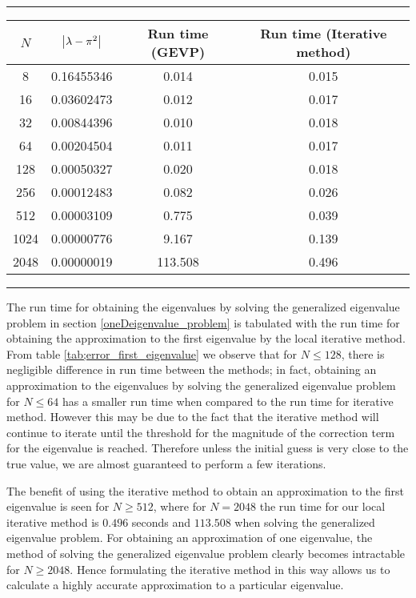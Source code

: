 \documentclass[a4paper, 12pt, twoside, openright]{article}
\numberwithin{equation}{section}
\begin{document}
\begin{table}[H]
\centering
\rule{\linewidth}{1.5pt}
\bgroup
\def\arrarystretch{1.25}
\begin{tabular}{ c@{\qquad} c@{\qquad} c@{\qquad} c@{\qquad} }
$N$ & $\abs{\lambda-\pi^2}$ & Run time (GEVP) & Run time (Iterative method) \\\hline
8 &   0.16455346   & 0.014 & 0.015 \\
16 &  0.03602473   & 0.012 & 0.017 \\
32 & 0.00844396   & 0.010  & 0.018\\
64 & 0.00204504   & 0.011 & 0.017\\
128 & 0.00050327 & 0.020 & 0.018\\
256 & 0.00012483 & 0.082 & 0.026\\
512 & 0.00003109  & 0.775 & 0.039 \\ 
1024 & 0.00000776 & 9.167  &0.139\\
2048 & 0.00000019 & 113.508 &0.496\\
\end{tabular}
\egroup
{}
\rule{\linewidth}{1.5pt}
\end{table}

The run time for obtaining the eigenvalues by solving the generalized eigenvalue problem in section \ref{oneDeigenvalue_problem} is tabulated with the run time for obtaining the approximation to the first eigenvalue by the local iterative method. From table \ref{tab;error_first_eigenvalue} we observe that for $N \leq 128$, there is negligible difference in run time between the methods; in fact, obtaining an approximation to the eigenvalues by solving the generalized eigenvalue problem for $N\leq64$ has a smaller run time when compared to the run time for iterative method. However this may be due to the fact that the iterative method will continue to iterate until the threshold for the magnitude of the correction term for the eigenvalue is reached. Therefore unless the initial guess is very close to the true value, we are almost guaranteed to perform a few iterations. %

The benefit of using the iterative method to obtain an approximation to the first eigenvalue is seen for $N\geq512$, where for $N=2048$ the run time for our local iterative method is $0.496$ seconds and $113.508$ when solving the generalized eigenvalue problem. For obtaining an approximation of one eigenvalue, the method of solving the generalized eigenvalue problem clearly becomes intractable for $N\geq2048$. Hence formulating the iterative method in this way allows us to calculate a highly accurate approximation to a particular eigenvalue. %
\end{document}
